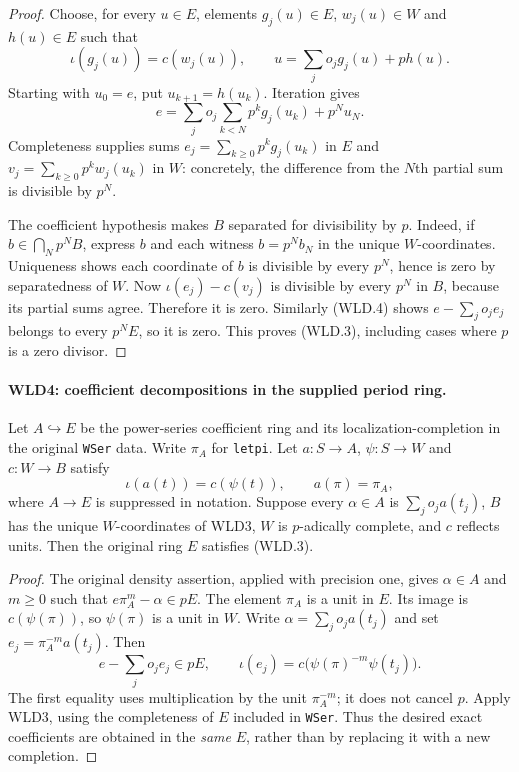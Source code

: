 \begin{proof}
Choose, for every $u\in E$, elements $g_j(u)\in E$, $w_j(u)\in W$
and $h(u)\in E$ such that
\[
 \iota(g_j(u))=c(w_j(u)),\qquad
                  u=\sum_j o_jg_j(u)+ph(u).
\]
Starting with $u_0=e$, put $u_{k+1}=h(u_k)$. Iteration gives
\[
 e=\sum_j o_j\sum_{k<N}p^kg_j(u_k)+p^Nu_N.                 \tag{WLD.4}
\]
Completeness supplies sums
$e_j=\sum_{k\ge0}p^kg_j(u_k)$ in $E$ and
$v_j=\sum_{k\ge0}p^kw_j(u_k)$ in $W$: concretely, the difference
from the $N$th partial sum is divisible by $p^N$.

The coefficient hypothesis makes $B$ separated for divisibility by
$p$. Indeed, if $b\in\bigcap_Np^NB$, express $b$ and each witness
$b=p^Nb_N$ in the unique $W$-coordinates. Uniqueness shows each
coordinate of $b$ is divisible by every $p^N$, hence is zero by
separatedness of $W$. Now
$\iota(e_j)-c(v_j)$ is divisible by every $p^N$ in $B$, because its
partial sums agree. Therefore it is zero. Similarly (WLD.4) shows
$e-\sum_j o_je_j$ belongs to every $p^NE$, so it is zero.
This proves (WLD.3), including cases where $p$ is a zero divisor.
\end{proof}

\paragraph{WLD4: coefficient decompositions in the supplied period ring.}
\label{claim:WLD4}
Let $A\hookrightarrow E$ be the power-series coefficient ring and its
localization-completion in the original \texttt{WSer} data. Write
$\pi_A$ for \texttt{letpi}. Let $a:S\to A$, $\psi:S\to W$ and
$c:W\to B$ satisfy
\[
       \iota(a(t))=c(\psi(t)),\qquad a(\pi)=\pi_A,
                                                               \tag{WLD.5}
\]
where $A\to E$ is suppressed in notation. Suppose every $\alpha\in A$
is $\sum_j o_ja(t_j)$, $B$ has the unique $W$-coordinates of WLD3,
$W$ is $p$-adically complete, and $c$ reflects units. Then the
original ring $E$ satisfies (WLD.3).

\begin{proof}
The original density assertion, applied with precision one, gives
$\alpha\in A$ and $m\ge0$ such that
$e\pi_A^m-\alpha\in pE$. The element $\pi_A$ is a unit in $E$.
Its image is $c(\psi(\pi))$, so $\psi(\pi)$ is a unit in $W$.
Write $\alpha=\sum_j o_ja(t_j)$ and set
$e_j=\pi_A^{-m}a(t_j)$. Then
\[
 e-\sum_j o_je_j\in pE,\qquad
 \iota(e_j)=c\bigl(\psi(\pi)^{-m}\psi(t_j)\bigr).
\]
The first equality uses multiplication by the unit $\pi_A^{-m}$;
it does not cancel $p$. Apply WLD3, using the completeness of $E$
included in \texttt{WSer}. Thus the desired exact coefficients
are obtained in the \emph{same} $E$, rather than by replacing it with
a new completion.
\end{proof}

